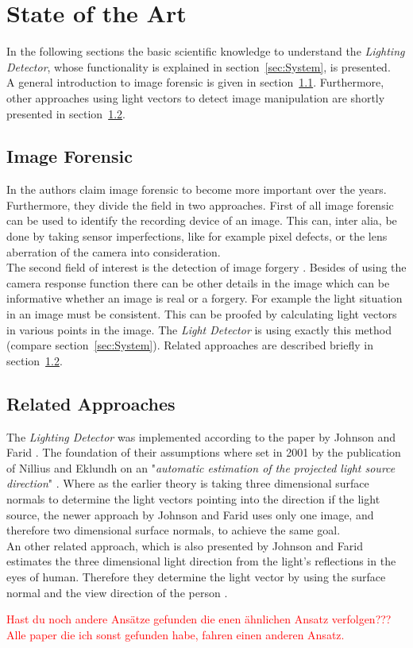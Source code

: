 \section{State of the Art} \label{sec:StateOfTheArt}
In the following sections the basic scientific knowledge to understand the \textit{Lighting Detector}, whose functionality is explained in section~\ref{sec:System}, is presented.\\
A general introduction to image forensic is given in section~\ref{sec:imageForensic}.
Furthermore, other approaches using light vectors to detect image manipulation are shortly presented in section~\ref{sec:otherApproaches}.


\subsection{Image Forensic}\label{sec:imageForensic}
In \cite{4284575} the authors claim image forensic to become more important over the years. Furthermore, they divide the field in two approaches. First of all image forensic can be used to identify the recording device of an image. This can, inter alia, be done by taking sensor imperfections, like for example pixel defects, or the lens aberration of the camera into consideration. \\
The second field of interest is the detection of image forgery \cite{4806202}. Besides of using the camera response function there can be other details in the image which can be informative whether an image is real or a forgery. For example the light situation in an image must be consistent. This can be proofed by calculating light vectors in various points in the image. The \textit{Light Detector} is using exactly this method (compare section~\ref{sec:System}). Related approaches are described briefly in section~\ref{sec:otherApproaches}.


\subsection{Related Approaches} \label{sec:otherApproaches}
The \textit{Lighting Detector} was implemented according to the paper by Johnson and Farid \cite{Johnson}. The foundation of their assumptions where set in 2001 by the publication of Nillius and Eklundh on an "\textit{automatic estimation of the projected light source direction}" \cite{990650}. Where as the earlier theory is taking three dimensional surface normals to determine the light vectors pointing into the direction if the light source, the newer approach by Johnson and Farid uses only one image, and therefore two dimensional surface normals, to achieve the same goal. \\
An other related approach, which is also presented by Johnson and Farid estimates the three dimensional light direction from the light's reflections in the eyes of human. Therefore they determine the light vector by using the surface normal and the view direction of the person \cite{johnson06specular}.

\textcolor{red}{Hast du noch andere Ansätze gefunden die enen ähnlichen Ansatz verfolgen??? Alle paper die ich sonst gefunden habe, fahren einen anderen Ansatz.} 


\newpage
